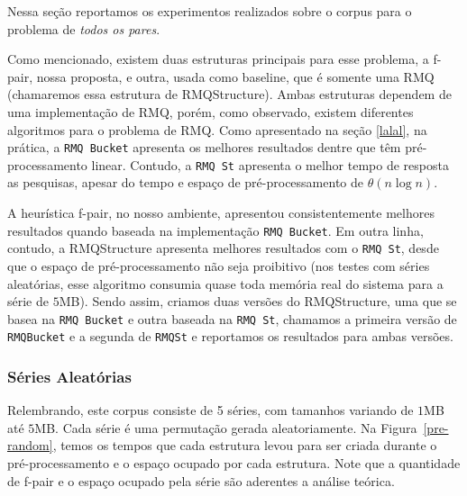 \documentclass[12pt]{article}
\begin{document}
Nessa seção reportamos os experimentos realizados sobre 
o corpus para o problema de \textit{todos os pares}.

Como mencionado, existem duas estruturas principais para esse problema, a f-pair, nossa proposta,
e outra, usada como baseline, que é somente uma RMQ (chamaremos essa estrutura
de RMQStructure). Ambas estruturas dependem de uma implementação de RMQ, porém, como observado,
 existem diferentes algoritmos para o problema de RMQ. Como apresentado na seção \ref{lalal}, na prática, a \verb|RMQ Bucket|
 apresenta os melhores resultados dentre que têm pré-processamento linear.
Contudo, a \verb|RMQ St| apresenta o melhor tempo de resposta as pesquisas, apesar do tempo 
e espaço de pré-processamento de $\theta(n \log n)$.

A heurística f-pair, no nosso ambiente, apresentou consistentemente melhores resultados 
quando baseada na implementação \verb|RMQ Bucket|. Em outra linha, contudo, a RMQStructure apresenta
melhores resultados com o \verb|RMQ St|, desde que o espaço de pré-processamento 
não seja proibitivo (nos testes com séries aleatórias, esse algoritmo
consumia quase toda memória real do sistema para a série de $5$MB). Sendo assim, criamos duas versões
do RMQStructure, uma que se basea na \verb|RMQ Bucket| e 
outra baseada na \verb|RMQ St|, chamamos a primeira versão de \verb|RMQBucket|
e a segunda de \verb|RMQSt| e reportamos os resultados para ambas versões.

\subsubsection{Séries Aleatórias}

Relembrando, este corpus consiste de 5 séries, com tamanhos variando de $1$MB até $5$MB.
Cada série é uma permutação gerada aleatoriamente. Na Figura~\ref{pre-random},
 temos os tempos que cada estrutura levou para ser criada durante o pré-processamento
e o espaço ocupado por cada estrutura. Note que a quantidade de f-pair e o espaço
ocupado pela série são aderentes a análise teórica.
\end{document}
